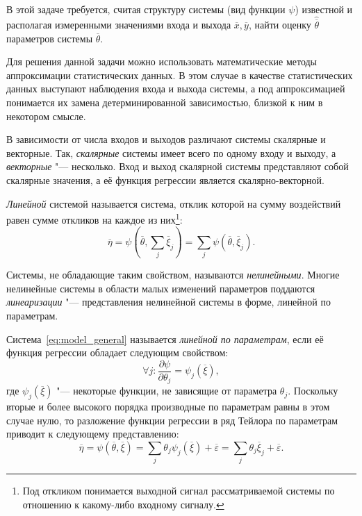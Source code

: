В этой задаче требуется,
считая структуру системы (вид функции \( \psi \)) известной и располагая
измеренными значениями входа и выхода \( \overline{x}, \overline{y} \),
найти оценку \( \hat{\overline{\theta}} \) параметров системы \( \overline{\theta} \).

Для решения данной задачи можно использовать математические методы аппроксимации статистических данных.
В этом случае в качестве статистических данных выступают наблюдения входа и выхода системы,
а под аппроксимацией понимается их замена детерминированной зависимостью,
близкой к ним в некотором смысле. %

В зависимости от числа входов и выходов различают системы скалярные и векторные.
Так, \emph{скалярные} системы имеет всего по одному входу и выходу, а \emph{векторные} "--- несколько.
Вход и выход скалярной системы представляют собой скалярные значения,
а её функция регрессии является скалярно-векторной.

\emph{Линейной} системой называется система,
отклик которой на сумму воздействий равен сумме откликов на каждое из них\footnote{%
  Под откликом понимается выходной сигнал рассматриваемой системы по отношению к
  какому-либо входному сигналу.}:
\begin{equation*}
  \overline{\eta} =
  \psi(\overline{\theta}, \sum_j \overline{\xi}_j) =
  \sum_j \psi(\overline{\theta}, \overline{\xi}_j).
\end{equation*}

Системы, не обладающие таким свойством, называются \emph{нелинейными}.
Многие нелинейные системы в области малых изменений параметров поддаются
\emph{линеаризации} "--- представления нелинейной системы в форме, линейной по параметрам.

Система~\eqref{eq:model_general} называется \emph{линейной по параметрам},
если её функция регрессии обладает следующим свойством:
\begin{equation*}
  \forall j: \dfrac{\partial \psi}{\partial \theta_j} = \psi_j(\overline{\xi}),
\end{equation*}
где \( \psi_j(\overline{\xi}) \) "--- некоторые функции, не зависящие от параметра \( \theta_j \).
Поскольку вторые и более высокого порядка производные по параметрам равны в этом случае нулю,
то разложение функции регрессии в ряд Тейлора по параметрам приводит к следующему представлению:
\begin{equation*}
  \overline{\eta} =
  \psi(\overline{\theta}, \overline{\xi}) =
  \sum_j \theta_j \psi_j(\overline{\xi}) + \overline{\varepsilon} =
  \sum_j \theta_j \overline{\xi}_j + \overline{\varepsilon}.
\end{equation*}

